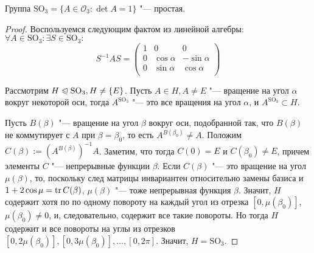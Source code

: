 \begin{theorem}
	Группа $\mathrm{SO}_3 = \{A \in \mathcal{O}_3: \det{A} = 1\}$ "--- простая.
\end{theorem}

\begin{proof}
	Воспользуемся следующим фактом из линейной алгебры: $\forall A \in \mathrm{SO}_3: \exists S \in \mathrm{SO_3}:$
	\[S^{-1}AS = \begin{pmatrix}
		1 & 0 & 0 \\
		0 & \cos\alpha & -\sin\alpha\\
		0 & \sin\alpha & \cos\alpha\\
	\end{pmatrix}\]
	
	Рассмотрим $H \trianglelefteqslant \mathrm{SO}_3, H \ne \{E\}$. Пусть $A \in H, A \ne E$ "--- вращение на угол $\alpha$ вокруг некоторой оси, тогда $A^{\mathrm{SO}_3}$ "--- это все вращения на угол $\alpha$, и $A^{\mathrm{SO}_3} \subset H$.
	
	Пусть $B(\beta)$ "--- вращение на угол $\beta$ вокруг оси, подобранной так, что $B(\beta)$ не коммутирует с $A$ при $\beta = \beta_0$, то есть $A^{B(\beta_0)} \ne A$. Положим $C(\beta) := (A^{B(\beta)})^{-1}A$. Заметим, что тогда $C(0) = E$ и $C(\beta_0) \ne E$, причем элементы $C$ "--- непрерывные функции $\beta$. Если $C(\beta)$ "--- это вращение на угол $\mu(\beta)$, то, поскольку след матрицы инвариантен относительно замены базиса и $1 + 2\cos\mu = \operatorname{tr} C(\beta)$, $\mu(\beta)$ "--- тоже непрерывная функция $\beta$. Значит, $H$ содержит хотя по по одному повороту на каждый угол из отрезка $[0, \mu(\beta_0)]$, $\mu(\beta_0) \ne 0$, и, следовательно, содержит все такие повороты. Но тогда $H$ содержит и все повороты на углы из отрезков $[0, 2\mu(\beta_0)], [0, 3\mu(\beta_0)], \dotsc, [0, 2\pi]$. Значит, $H = \mathrm{SO}_3$.
\end{proof}